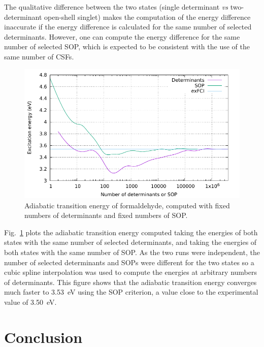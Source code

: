 \documentclass[aip,jcp,reprint,showkeys]{revtex4-1}
\newcommand{\sop}{SOP}
\newcommand{\csf}{CSF}
\begin{document}
The qualitative difference between the two states (single determinant
\textit{vs} two-determinant open-shell singlet) makes the computation of
the energy difference inaccurate if the energy difference is calculated for
the same number of selected determinants. 
However, one can compute the energy difference for the same number of selected
{\sop}, which is expected to be consistent with the use of the same number of
{\csf s}.

\begin{figure}
\includegraphics[width=0.9\columnwidth]{formaldehyde}
\caption{Adiabatic transition energy of formaldehyde, computed with fixed numbers of 
determinants and fixed numbers of {\sop}.}
\label{fig:formaldehyde}
\end{figure}

Fig.~\ref{fig:formaldehyde} plots the adiabatic transition energy computed
taking the energies of both states with the same number of selected
determinants, and taking the energies of both states with the same number of
{\sop}.
As the two runs were independent, the number of selected determinants and
{\sop s} were different for the two states so a cubic spline interpolation
was used to compute the energies at arbitrary numbers of determinants.
This figure shows that the adiabatic transition energy converges much
faster to 3.53~eV using the {\sop} criterion, a value close to the
experimental value of 3.50~eV.\cite{Clouthier_1983,Angeli_2005}


\section{Conclusion}
\end{document}
